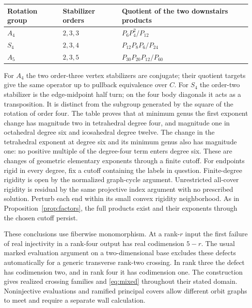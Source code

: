 {\def\LTcaptype{table} %
\begin{longtable}[]{@{}
  >{\raggedright\arraybackslash}p{}
  >{\raggedright\arraybackslash}p{}
  >{\raggedright\arraybackslash}p{}@{}}
\toprule\noalign{}
\begin{minipage}[b]{\linewidth}\raggedright
Rotation group
\end{minipage} & \begin{minipage}[b]{\linewidth}\raggedright
Stabilizer orders
\end{minipage} & \begin{minipage}[b]{\linewidth}\raggedright
Quotient of the two downstairs products
\end{minipage} \\
\midrule\noalign{}
\endhead
\bottomrule\noalign{}
\endlastfoot
\(A_4\) & \(2,3,3\) & \(P_6 P_4^2/P_{12}\) \\
\(S_4\) & \(2,3,4\) & \(P_{12}P_8P_6/P_{24}\) \\
\(A_5\) & \(2,3,5\) & \(P_{30}P_{20}P_{12}/P_{60}\) \\
\end{longtable}
}

For \(A_4\) the two order-three vertex stabilizers are conjugate; their quotient targets give the same operator up to pullback equivalence over \(C\). For \(S_4\) the order-two stabilizer is the edge-midpoint half turn; on the four body diagonals it acts as a transposition. It is distinct from the subgroup generated by the square of the rotation of order four. The table proves that at minimum genus the first exponent change has magnitude two in tetrahedral degree four, and magnitude one in octahedral degree six and icosahedral degree twelve. The change in the tetrahedral exponent at degree six and its minimum genus also has magnitude one: no positive multiple of the degree-four term enters degree six. These are changes of geometric elementary exponents through a finite cutoff. For endpoints rigid in every degree, fix a cutoff containing the labels in question. Finite-degree rigidity is open by the normalized graph-cycle argument. Unrestricted all-cover rigidity is residual by the same projective index argument with no prescribed solution. Perturb each end within its small convex rigidity neighborhood. As in Proposition~\ref{prop:factors}, the full products exist and their exponents through the chosen cutoff persist. 

These conclusions use fiberwise monomorphism. At a rank-\(r\) input the first failure of real injectivity in a rank-four output has real codimension \(5-r\). The usual marked evaluation argument on a two-dimensional base excludes these defects automatically for a generic transverse rank-two crossing. In rank three the defect has codimension two, and in rank four it has codimension one. The construction gives realized crossing families and \eqref{eq:mixed} throughout their stated domain. Noninjective evaluations and ramified principal covers allow different orbit graphs to meet and require a separate wall calculation.
